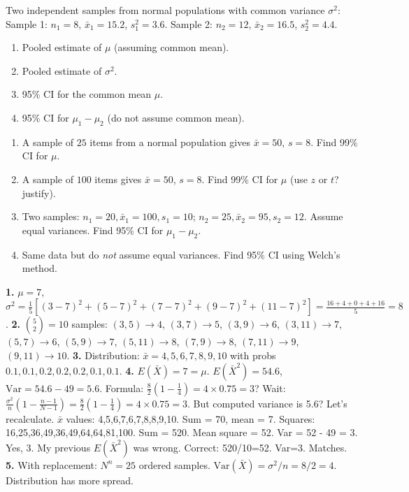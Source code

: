 \documentclass[11pt]{article}
\begin{document}
\begin{exercice}
Two independent samples from normal populations with common variance $\sigma^2$:
Sample 1: $n_1=8$, $\bar{x}_1=15.2$, $s_1^2=3.6$.
Sample 2: $n_2=12$, $\bar{x}_2=16.5$, $s_2^2=4.4$.
\begin{enumerate}
\item Pooled estimate of $\mu$ (assuming common mean).
\item Pooled estimate of $\sigma^2$.
\item 95\% CI for the common mean $\mu$.
\item 95\% CI for $\mu_1 - \mu_2$ (do not assume common mean).
\end{enumerate}
\end{exercice}

\begin{exercice}
\begin{enumerate}
\item A sample of $25$ items from a normal population gives $\bar{x}=50$, $s=8$. Find 99\% CI for $\mu$.
\item A sample of $100$ items gives $\bar{x}=50$, $s=8$. Find 99\% CI for $\mu$ (use $z$ or $t$? justify).
\item Two samples: $n_1=20, \bar{x}_1=100, s_1=10$; $n_2=25, \bar{x}_2=95, s_2=12$. Assume equal variances. Find 95\% CI for $\mu_1-\mu_2$.
\item Same data but do \emph{not} assume equal variances. Find 95\% CI using Welch's method.
\end{enumerate}
\end{exercice}

\begin{corrige}
\textbf{1.} $\mu = 7$, $\sigma^2 = \frac{1}{5}[(3-7)^2+(5-7)^2+(7-7)^2+(9-7)^2+(11-7)^2] = \frac{16+4+0+4+16}{5} = 8$.
\textbf{2.} $\binom{5}{2}=10$ samples: $(3,5)\to4$, $(3,7)\to5$, $(3,9)\to6$, $(3,11)\to7$, $(5,7)\to6$, $(5,9)\to7$, $(5,11)\to8$, $(7,9)\to8$, $(7,11)\to9$, $(9,11)\to10$.
\textbf{3.} Distribution: $\bar{x}=4,5,6,7,8,9,10$ with probs $0.1,0.1,0.2,0.2,0.2,0.1,0.1$.
\textbf{4.} $E(\bar{X})=7=\mu$. $E(\bar{X}^2)=54.6$, $\mathrm{Var}=54.6-49=5.6$. Formula: $\frac{8}{2}(1-\frac{1}{4})=4\times0.75=3$? Wait: $\frac{\sigma^2}{n}(1-\frac{n-1}{N-1}) = \frac{8}{2}(1-\frac{1}{4}) = 4 \times 0.75 = 3$. But computed variance is 5.6? Let's recalculate.
$\bar{x}$ values: 4,5,6,7,6,7,8,8,9,10. Sum = 70, mean = 7. Squares: 16,25,36,49,36,49,64,64,81,100. Sum = 520. Mean square = 52. Var = 52 - 49 = 3. Yes, 3. My previous $E(\bar{X}^2)$ was wrong. Correct: 520/10=52. Var=3. Matches.
\textbf{5.} With replacement: $N^n=25$ ordered samples. $\mathrm{Var}(\bar{X}) = \sigma^2/n = 8/2 = 4$. Distribution has more spread.
\end{corrige}
\end{document}
